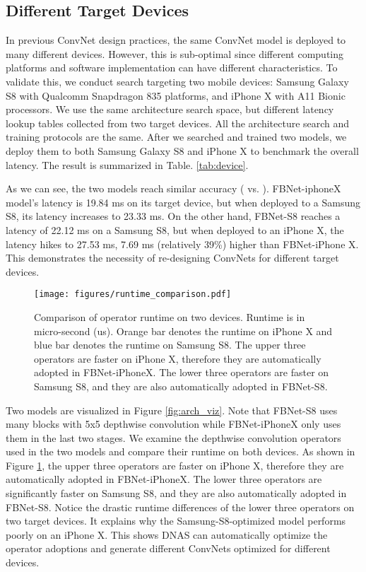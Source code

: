 \documentclass[10pt,twocolumn,letterpaper]{article}
\begin{document}
\subsection{Different Target Devices}
In previous ConvNet design practices, the same ConvNet model is deployed to many different devices. However, this is sub-optimal since different computing platforms and software implementation can have different characteristics. To validate this, we conduct search targeting two mobile devices: Samsung Galaxy S8 with Qualcomm Snapdragon 835 platforms, and iPhone X with A11 Bionic processors. We use the same architecture search space, but different latency lookup tables collected from two target devices. All the architecture search and training protocols are the same. After we searched and trained two models, we deploy them to both Samsung Galaxy S8 and iPhone X to benchmark the overall latency. The result is summarized in Table. \ref{tab:device}. 

As we can see, the two models reach similar accuracy ( vs. ). FBNet-iphoneX model's latency is 19.84 ms on its target device, but when deployed to a Samsung S8, its latency increases to 23.33 ms. On the other hand, FBNet-S8 reaches a latency of 22.12 ms on a Samsung S8, but when deployed to an iPhone X, the latency hikes to 27.53 ms, 7.69 ms (relatively 39\%) higher than FBNet-iPhone X. 
This demonstrates the necessity of re-designing ConvNets for different target devices. 

\begin{figure}[h]
\begin{center}
\texttt{[image: figures/runtime\_comparison.pdf]}
\end{center}
\caption{Comparison of operator runtime on two devices. Runtime is in micro-second (us). Orange bar denotes the runtime on iPhone X and blue bar denotes the runtime on Samsung S8. The upper three operators are faster on iPhone X, therefore they are automatically adopted in FBNet-iPhoneX. The lower three operators are faster on Samsung S8, and they are also automatically adopted in FBNet-S8.}
\label{fig:runtime_comparision}
\vspace{-14pt}
\end{figure}

Two models are visualized in Figure \ref{fig:arch_viz}. Note that FBNet-S8 uses many blocks with 5x5 depthwise convolution while FBNet-iPhoneX only uses them in the last two stages. We examine the depthwise convolution operators used in the two models and compare their runtime on both devices. As shown in Figure \ref{fig:runtime_comparision}, the upper three operators are faster on iPhone X, therefore they are automatically adopted in FBNet-iPhoneX. The lower three operators are significantly faster on Samsung S8, and they are also automatically adopted in FBNet-S8. Notice the drastic runtime differences of the lower three operators on two target devices. It explains why the Samsung-S8-optimized model performs poorly on an iPhone X. This shows DNAS can automatically optimize the operator adoptions and generate different ConvNets optimized for different devices. 
\end{document}
